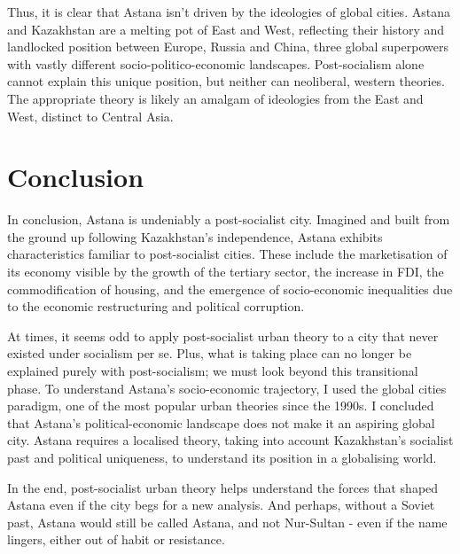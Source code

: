 \documentclass{article}
\begin{document}
Thus, it is clear that Astana isn't driven by the ideologies of global cities. Astana and Kazakhstan are a melting pot of East and West, reflecting their history and landlocked position between Europe, Russia and China, three global superpowers with vastly different socio-politico-economic landscapes. Post-socialism alone cannot explain this unique position, but neither can neoliberal, western theories. The appropriate theory is likely an amalgam of ideologies from the East and West, distinct to Central Asia.

\section{Conclusion}

In conclusion, Astana is undeniably a post-socialist city. Imagined and built from the ground up following Kazakhstan's independence, Astana exhibits characteristics familiar to post-socialist cities. These include the marketisation of its economy visible by the growth of the tertiary sector, the increase in FDI, the commodification of housing, and the emergence of socio-economic inequalities due to the economic restructuring and political corruption.

At times, it seems odd to apply post-socialist urban theory to a city that never existed under socialism per se. Plus, what is taking place can no longer be explained purely with post-socialism; we must look beyond this transitional phase.
To understand Astana's socio-economic trajectory, I used the global cities paradigm, one of the most popular urban theories since the 1990s. I concluded that Astana's political-economic landscape does not make it an aspiring global city.
Astana requires a localised theory, taking into account Kazakhstan's socialist past and political uniqueness, to understand its position in a globalising world.

In the end, post-socialist urban theory helps understand the forces that shaped Astana even if the city begs for a new analysis.
And perhaps, without a Soviet past, Astana would still be called Astana, and not Nur-Sultan - even if the name lingers, either out of habit or resistance.

\end{document}
